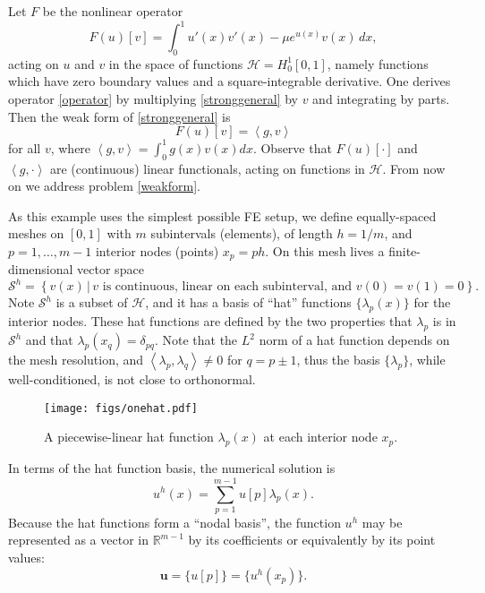 \documentclass[letterpaper,final,12pt,reqno]{amsart}
\newcommand{\RR}{\mathbb{R}}
\newcommand{\bu}{\mathbf{u}}
\newcommand{\ip}[2]{\left<#1,#2\right>}
\begin{document}
Let $F$ be the nonlinear operator
\begin{equation}
  F(u)[v] = \int_0^1 u'(x) v'(x) - \mu e^{u(x)} v(x)\, dx,  \label{operator}
\end{equation}
acting on $u$ and $v$ in the space of functions $\mathcal{H}=H_0^1[0,1]$, namely functions which have zero boundary values and a square-integrable derivative.  One derives operator \eqref{operator} by multiplying \eqref{stronggeneral} by $v$ and integrating by parts.  Then the weak form of \eqref{stronggeneral} is
\begin{equation}
  F(u)[v] = \ip{g}{v} \label{weakform}
\end{equation}
for all $v$, where $\ip{g}{v} = \int_0^1 g(x) v(x) dx$.  Observe that $F(u)[\cdot]$ and $\ip{g}{\cdot}$ are (continuous) linear functionals, acting on functions in $\mathcal{H}$.  From now on we address problem \eqref{weakform}.

As this example uses the simplest possible FE setup, we define equally-spaced meshes on $[0,1]$ with $m$ subintervals (elements), of length $h=1/m$, and $p=1,\dots,m-1$ interior nodes (points) $x_p=ph$.  On this mesh lives a finite-dimensional vector space
\begin{equation}
\mathcal{S}^h = \left\{v(x)\,\big|\,v \text{ is continuous, linear on each subinterval, and } v(0)=v(1)=0\right\}.  \label{fespace}
\end{equation}
Note $\mathcal{S}^h$ is a subset of $\mathcal{H}$, and it has a basis of ``hat'' functions $\{\lambda_p(x)\}$ for the interior nodes.  These hat functions are defined by the two properties that $\lambda_p$ is in $\mathcal{S}^h$ and that $\lambda_p(x_q)=\delta_{pq}$.  Note that the $L^2$ norm of a hat function depends on the mesh resolution, and $\ip{\lambda_p}{\lambda_q}\ne 0$ for $q=p\pm1$, thus the basis $\{\lambda_p\}$, while well-conditioned, is not close to orthonormal.

\begin{figure}
\texttt{[image: figs/onehat.pdf]}
\caption{A piecewise-linear hat function $\lambda_p(x)$ at each interior node $x_p$.}
\label{fig:onehat}
\end{figure}

In terms of the hat function basis, the numerical solution is
\begin{equation}
  u^h(x) = \sum_{p=1}^{m-1} u[p] \lambda_p(x).  \label{fesolution}
\end{equation}
Because the hat functions form a ``nodal basis'', the function $u^h$ may be represented as a vector in $\RR^{m-1}$ by its coefficients or equivalently by its point values:
\begin{equation}
\bu =\{u[p]\} = \{u^h(x_p)\}.  \label{fevector}
\end{equation}
\end{document}
